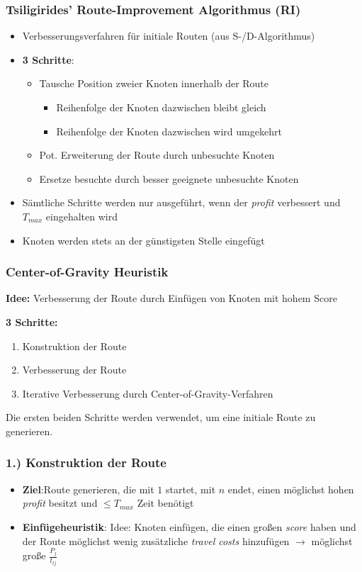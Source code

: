 \documentclass{beamer}
\begin{document}
\begin{frame}
  \frametitle{Tsiligirides' Route-Improvement Algorithmus (RI)}
  \begin{itemize}
    \item Verbesserungsverfahren für initiale Routen (aus S-/D-Algorithmus)
    \item \textbf{3 Schritte}:
    \begin{itemize}
      \item Tausche Position zweier Knoten innerhalb der Route
      \begin{itemize}
        \item Reihenfolge der Knoten dazwischen bleibt gleich
        \item Reihenfolge der Knoten dazwischen wird umgekehrt
      \end{itemize}
      \item Pot. Erweiterung der Route durch unbesuchte Knoten
      \item Ersetze besuchte durch besser geeignete unbesuchte Knoten
    \end{itemize}
    \item Sämtliche Schritte werden nur ausgeführt, wenn der \textit{profit} verbessert und $T_{max}$ eingehalten wird
    \item Knoten werden stets an der günstigsten Stelle eingefügt
  \end{itemize}
\end{frame}

\begin{frame}
  \frametitle{Center-of-Gravity Heuristik}
  \textbf{Idee:}
  Verbesserung der Route durch Einfügen von Knoten mit hohem Score \

  \textbf{3 Schritte:}
  \begin{enumerate}
    \item Konstruktion der Route
    \item Verbesserung der Route
    \item Iterative Verbesserung durch Center-of-Gravity-Verfahren
  \end{enumerate}
  Die ersten beiden Schritte werden verwendet, um eine initiale Route zu generieren.
\end{frame}

\begin{frame}
  \frametitle{1.) Konstruktion der Route}
  \begin{itemize}
    \item \textbf{Ziel}:\newline Route generieren, die mit $1$ startet, mit $n$ endet, einen möglichst hohen \textit{profit} besitzt
    und $\leq T_{max}$ Zeit benötigt
    \item \textbf{Einfügeheuristik}:\newline
    Idee: Knoten einfügen, die einen großen \textit{score} haben und der Route
    möglichst wenig zusätzliche \textit{travel costs} hinzufügen\newline
    $\rightarrow$ möglichst große $\frac{P_j}{t_{lj}}$
  \end{itemize}
\end{frame}
\end{document}
